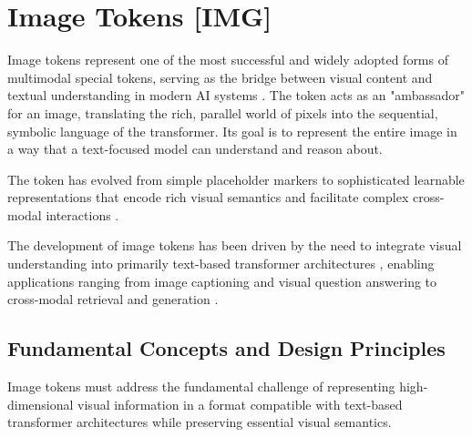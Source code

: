 
\section{Image Tokens [IMG]}

Image tokens represent one of the most successful and widely adopted forms of multimodal special tokens, serving as the bridge between visual content and textual understanding in modern AI systems \citep{radford2021learning, li2022blip}. The \img{} token acts as an "ambassador" for an image, translating the rich, parallel world of pixels into the sequential, symbolic language of the transformer. Its goal is to represent the entire image in a way that a text-focused model can understand and reason about.

The \img{} token has evolved from simple placeholder markers to sophisticated learnable representations that encode rich visual semantics and facilitate complex cross-modal interactions \citep{alayrac2022flamingo, li2023blip2}.

\begin{comment}
Feedback: This is a strong opening. To make the concept even more concrete, you could add an analogy: "The [IMG] token acts as an 'ambassador' for an image, translating the rich, parallel world of pixels into the sequential, symbolic language of the transformer. Its goal is to represent the entire image in a way that a text-focused model can understand and reason about."

STATUS: addressed - added ambassador analogy to make image token concept more concrete
\end{comment}

The development of image tokens has been driven by the need to integrate visual understanding into primarily text-based transformer architectures \citep{dosovitskiy2020image}, enabling applications ranging from image captioning and visual question answering \citep{liu2023visual} to cross-modal retrieval and generation \citep{ramesh2022hierarchical, saharia2022photorealistic}.

\subsection{Fundamental Concepts and Design Principles}

Image tokens must address the fundamental challenge of representing high-dimensional visual information in a format compatible with text-based transformer architectures while preserving essential visual semantics.

